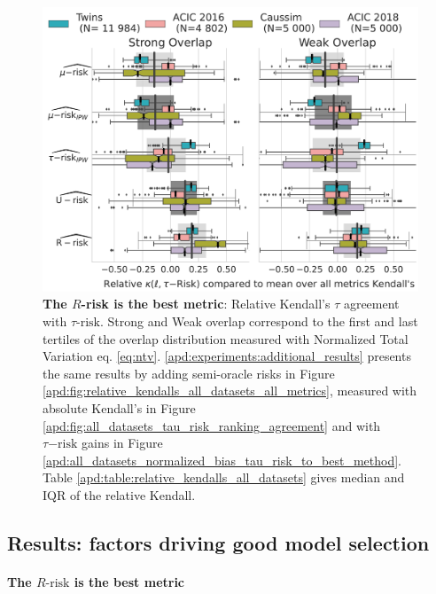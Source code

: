 \documentclass[french,12pt,twoside,a4paper]{book}
\begin{document}
\begin{figure}[!b]
  \centering
  \includegraphics[width=0.9\linewidth]{img/chapter_5/_1_r_risk_domination_r_risk_domination__ref_metric_mean_risks_by_Dataset_feasible_only.pdf}
  \caption{\textbf{The $R$-risk is the best metric}: Relative Kendall's $\tau$ agreement with $\tau\text{-risk}$.
    Strong and Weak overlap correspond to the first and last tertiles of the overlap distribution measured with
    Normalized Total Variation eq. \ref{eq:ntv}. \ref{apd:experiments:additional_results} presents the same results
    by adding semi-oracle risks in Figure \ref{apd:fig:relative_kendalls_all_datasets_all_metrics}, measured with
    absolute Kendall's in Figure \ref{apd:fig:all_datasets_tau_risk_ranking_agreement} and with $\tau\mathrm{-risk}$
    gains in Figure \ref{apd:all_datasets_normalized_bias_tau_risk_to_best_method}. Table
    \ref{apd:table:relative_kendalls_all_datasets} gives median and
    IQR of the relative Kendall.}\label{fig:relative_kendalls_all_datasets}
\end{figure}

\subsection{Results: factors driving good model selection}%
\label{subsec:causal_model_selection:empirical_results}%

\paragraph{The $R\text{-risk}$ is the best metric}
\end{document}
